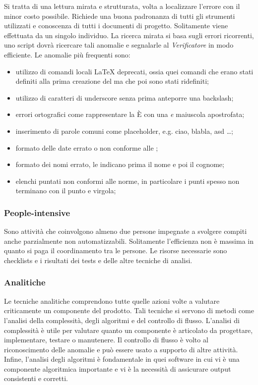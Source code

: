			Si tratta di una lettura mirata e strutturata, volta a localizzare l'errore con il minor costo possibile. Richiede una buona padronanza di tutti gli strumenti utilizzati e conoscenza di tutti i documenti di progetto. Solitamente viene effettuata da un singolo individuo. La ricerca mirata si basa sugli errori ricorrenti, uno script dovrà ricercare tali anomalie e segnalarle al \emph{Verificatore} in modo efficiente.
			Le anomalie più frequenti sono:
			\begin{itemize}
				\item utilizzo di comandi locali \LaTeX{} deprecati, ossia quei comandi che erano stati definiti alla prima creazione del  ma che poi sono stati ridefiniti;
				\item utilizzo di caratteri di underscore senza prima anteporre una backslash;
				\item errori ortografici come rappresentare la È con una \emph{e} maiuscola apostrofata;
				\item inserimento di parole comuni come placeholder, e.g. ciao, blabla, asd \dots;
				\item formato delle date errato o non conforme alle \NormeDiProgetto{};
				\item formato dei nomi errato, le \NormeDiProgetto{} indicano prima il nome e poi il cognome;
				\item elenchi puntati non conformi alle norme, in particolare i punti spesso non terminano con il punto e virgola;
				

			\end{itemize}
			
			
		\subsubsection{People-intensive}

		Sono attività che coinvolgono almeno due persone impegnate a svolgere compiti anche parzialmente non automatizzabili. Solitamente l'efficienza non è massima in quanto si paga il coordinamento tra le persone. Le risorse necessarie sono checklists e i risultati dei tests e delle altre tecniche di analisi.
	
		\subsubsection{Analitiche}

		Le tecniche analitiche comprendono tutte quelle azioni volte a valutare criticamente un componente del prodotto. Tali tecniche si servono di metodi come l'analisi della complessità, degli algoritmi e del controllo di flusso. L'analisi di complessità è utile per valutare quanto un componente è articolato da progettare, implementare, testare o manutenere. Il controllo di flusso è volto al riconoscimento delle anomalie e può essere usato a supporto di altre attività. Infine, l'analisi degli algoritmi è fondamentale in quei software in cui vi è una componente algoritmica importante e vi è la necessità di assicurare output consistenti e corretti. 
				
